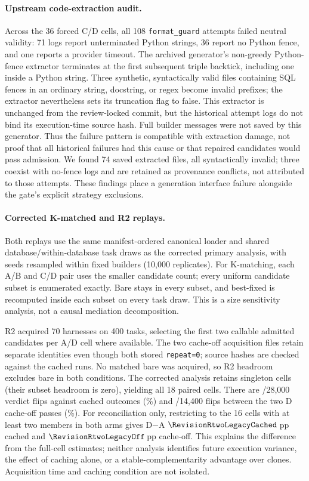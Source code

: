 \paragraph{Upstream code-extraction audit.}\label{app:extraction}
Across the 36 forced C/D cells, all 108 \texttt{format\_guard} attempts
failed neutral validity: 71 logs report unterminated Python strings,
36 report no Python fence, and one reports a provider timeout.
The archived generator's non-greedy Python-fence extractor terminates at
the first subsequent triple backtick, including one inside a Python
string. Three synthetic, syntactically valid files containing SQL fences
in an ordinary string, docstring, or regex become invalid prefixes;
the extractor nevertheless sets its truncation flag to false.
This extractor is unchanged from the review-locked commit, but the historical attempt
logs do not bind its execution-time source hash. Full builder messages
were not saved by this generator. Thus the failure pattern is compatible
with extraction damage, not proof that all historical failures had this
cause or that repaired candidates would pass admission.
We found 74 saved extracted files, all syntactically invalid; three
coexist with no-fence logs and are retained as provenance conflicts,
not attributed to those attempts. These findings place a generation
interface failure alongside the gate's explicit strategy exclusions.

\paragraph{Corrected K-matched and R2 replays.}\label{app:r2}
Both replays use the same manifest-ordered canonical loader and shared
database/within-database task draws as the corrected primary analysis,
with seeds resampled within fixed builders (10{,}000 replicates).
For K-matching, each A/B and C/D pair uses the smaller candidate count;
every uniform candidate subset is enumerated exactly. Bare stays in every
subset, and best-fixed is recomputed inside each subset on every task draw.
This is a size sensitivity analysis, not a causal mediation decomposition.

R2 acquired 70 harnesses on 400 tasks, selecting the first two callable
admitted candidates per A/D cell where available. The two cache-off
acquisition files retain separate identities even though both stored
\texttt{repeat=0}; source hashes are checked against the cached runs.
No matched bare was acquired, so R2 headroom excludes bare in both
conditions. The corrected analysis retains singleton cells (their subset
headroom is zero), yielding all 18 paired cells.
There are \RevisionRtwoFlips/28{,}000 verdict flips against cached outcomes
(\RevisionRtwoFlipPercent\%) and
\RevisionRtwoRepeatFlips/14{,}400 flips between the two D cache-off passes
(\RevisionRtwoRepeatPercent\%).
For reconciliation only, restricting to the 16 cells with at least two
members in both arms gives D$-$A $\RevisionRtwoLegacyCached$\,pp cached
and $\RevisionRtwoLegacyOff$\,pp cache-off. This explains the difference
from the full-cell estimates; neither analysis identifies future execution
variance, the effect of caching alone, or a stable-complementarity advantage
over clones. Acquisition time and caching condition are not isolated.

